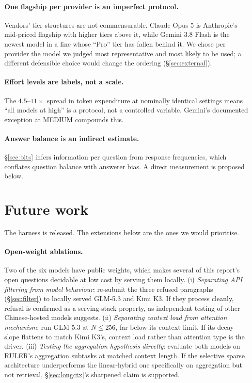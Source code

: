 \documentclass[11pt]{article}
\begin{document}
\paragraph{One flagship per provider is an imperfect protocol.} Vendors' tier
structures are not commensurable. Claude Opus 5 is Anthropic's mid-priced
flagship with higher tiers above it, while Gemini 3.8 Flash is the newest
model in a line whose ``Pro'' tier has fallen behind it. We chose per provider
the model we judged most representative and most likely to be used; a different
defensible choice would change the ordering (\S\ref{sec:external}).

\paragraph{Effort levels are labels, not a scale.} The $4.5$--$11\times$ spread in
token expenditure at nominally identical settings means ``all models at high''
is a protocol, not a controlled variable. Gemini's documented exception at
MEDIUM compounds this.

\paragraph{Answer balance is an indirect estimate.} \S\ref{sec:bits} infers
information per question from response frequencies, which conflates question
balance with answerer bias. A direct measurement is proposed below.

\section{Future work}
\label{sec:future}

The harness is released. The extensions below are the ones we would
prioritise.

\paragraph{Open-weight ablations.} Two of the six models have public weights,
which makes several of this report's open questions decidable at low cost by
serving them locally.
(i) \emph{Separating API filtering from model behaviour}: re-submit the three
refused paragraphs (\S\ref{sec:filter}) to locally served GLM-5.3 and Kimi K3.
If they process cleanly, refusal is confirmed as a serving-stack property, as
independent testing of other Chinese-hosted models suggests.
(ii) \emph{Separating context load from attention mechanism}: run GLM-5.3 at
$N \le 256$, far below its context limit. If its decay slope flattens to match
Kimi K3's, context load rather than attention type is the driver.
(iii) \emph{Testing the aggregation hypothesis directly}: evaluate both models
on RULER's aggregation subtasks at matched context length. If the selective
sparse architecture underperforms the linear-hybrid one specifically on
aggregation but not retrieval, \S\ref{sec:longctx}'s sharpened claim is
supported.
\end{document}
